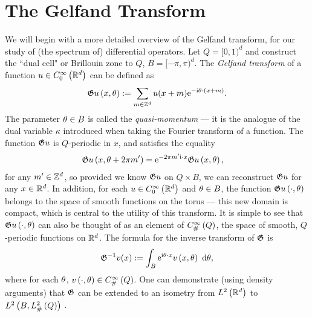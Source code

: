 \section{The Gelfand Transform} \label{sec:TP-GelfandTransform}
We will begin with a more detailed overview of the Gelfand transform, for our study of (the spectrum of) differential operators.
Let $Q=[0,1)^d$  and construct the ``dual cell" or Brillouin zone to $Q$, $B=[-\pi,\pi)^d$.
The \emph{Gelfand transform} of a function $u\in C^{\infty}_{0}\left( \mathbb{R}^d \right)$ can be defined as
\begin{align*}
	\mathfrak{G} u\left( x,\theta \right) := \sum_{m\in\mathbb{Z}^d}u(x+m)\mathrm{e}^{-\mathrm{i}\theta\cdot(x+m)}.
\end{align*}
The parameter $\theta\in B$ is called the \emph{quasi-momentum} --- it is the analogue of the dual variable $\kappa$ introduced when taking the Fourier transform of a function.
The function $\mathfrak{G} u$ is $Q$-periodic in $x$, and satisfies the equality
\begin{align} \label{eq:GelfandTransform}
	\mathfrak{G} u\left( x,\theta+2\pi m' \right) &= \mathrm{e}^{-2\pi m'\mathrm{i}\cdot x}\mathfrak{G} u\left( x,\theta \right),
\end{align}
for any $m'\in\mathbb{Z}^d$, so provided we know $\mathfrak{G} u$ on $Q\times B$, we can reconstruct $\mathfrak{G} u$ for any $x\in\mathbb{R}^d$.
In addition, for each $u\in C^{\infty}_{0}\left( \mathbb{R}^d \right)$ and $\theta\in B$, the function $\mathfrak{G} u\left( \cdot,\theta \right)$ belongs to the space of smooth functions on the torus --- this new domain is compact, which is central to the utility of this transform.
It is simple to see that $\mathfrak{G} u\left( \cdot,\theta \right)$ can also be thought of as an element of $C^{\infty}_{\#}\left( Q \right)$, the space of smooth, $Q$-periodic functions on $\mathbb{R}^d$.
The formula for the inverse transform of $\mathfrak{G}$ is
\begin{align*}
	\mathfrak{G}^{-1}v (x) := \int_{B}\mathrm{e}^{\mathrm{i}\theta\cdot x}v\left( x,\theta \right) \ \mathrm{d}\theta,
\end{align*}
where for each $\theta$, $v\left( \cdot,\theta \right)\in C^{\infty}_{\#}\left( Q \right)$.
One can demonstrate (using density arguments) that $\mathfrak{G}$ can be extended to an isometry from $L^2\left( \mathbb{R}^d \right)$ to $L^2\left( B,L^2_{\#}\left( Q \right) \right)$ .

